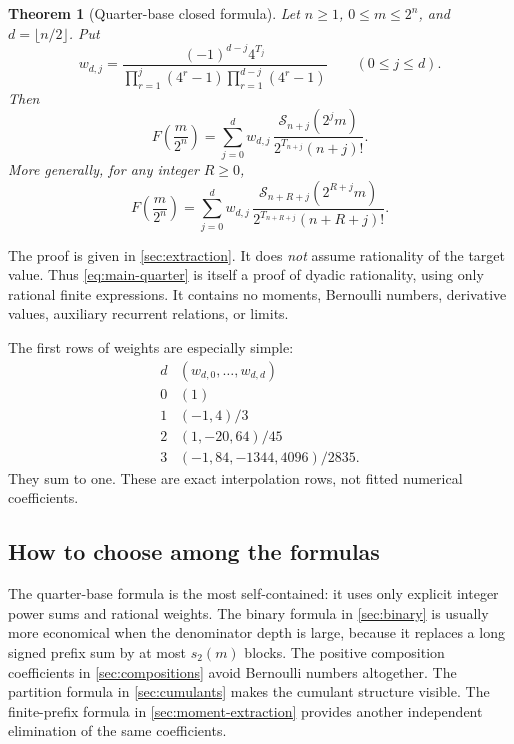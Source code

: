 \documentclass[11pt,a4paper]{article}
\numberwithin{equation}{section}
\newtheorem{theorem}{Theorem}[section]
\theoremstyle{definition}
\theoremstyle{remark}
\newcommand{\bits}{s_2}
\begin{document}
\begin{theorem}[Quarter-base closed formula]
\label{thm:main-quarter}
Let $n\ge1$, $0\le m\le2^n$, and $d=\lfloor n/2\rfloor$. Put
\begin{equation}
 w_{d,j}=
 \frac{(-1)^{d-j}4^{T_j}}
 {\displaystyle\prod_{r=1}^{j}(4^r-1)
  \displaystyle\prod_{r=1}^{d-j}(4^r-1)}
 \qquad(0\le j\le d).
 \label{eq:weights-integer}
\end{equation}
Then
\begin{equation}
 \boxed{\displaystyle
 F\!\left(\frac m{2^n}\right)=
 \sum_{j=0}^{d}w_{d,j}\,
 \frac{\mathcal S_{n+j}(2^jm)}{2^{T_{n+j}}(n+j)!}.}
 \label{eq:main-quarter}
\end{equation}
More generally, for any integer $R\ge0$,
\begin{equation}
 F\!\left(\frac m{2^n}\right)=
 \sum_{j=0}^{d}w_{d,j}\,
 \frac{\mathcal S_{n+R+j}(2^{R+j}m)}
 {2^{T_{n+R+j}}(n+R+j)!}.
 \label{eq:main-quarter-shift}
\end{equation}
\end{theorem}

The proof is given in \cref{sec:extraction}. It does \emph{not} assume rationality of the target value. Thus \cref{eq:main-quarter} is itself a proof of dyadic rationality, using only rational finite expressions. It contains no moments, Bernoulli numbers, derivative values, auxiliary recurrent relations, or limits.

The first rows of weights are especially simple:
\begin{equation}
\begin{array}{c|l}
 d & (w_{d,0},\ldots,w_{d,d})\\\hline
 0 &(1)\\
 1 &(-1,4)/3\\
 2 &(1,-20,64)/45\\
 3 &(-1,84,-1344,4096)/2835.
\end{array}
\label{eq:weight-rows}
\end{equation}
They sum to one. These are exact interpolation rows, not fitted numerical coefficients.

\subsection{How to choose among the formulas}
The quarter-base formula is the most self-contained: it uses only explicit integer power sums and rational weights. The binary formula in \cref{sec:binary} is usually more economical when the denominator depth is large, because it replaces a long signed prefix sum by at most $\bits(m)$ blocks. The positive composition coefficients in \cref{sec:compositions} avoid Bernoulli numbers altogether. The partition formula in \cref{sec:cumulants} makes the cumulant structure visible. The finite-prefix formula in \cref{sec:moment-extraction} provides another independent elimination of the same coefficients.
\end{document}
